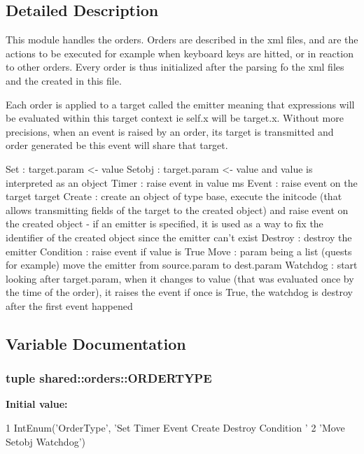 \subsection{\-Detailed \-Description}
\begin{DoxyVerb}
This module handles the orders.
Orders are described in the xml files, and are the actions to be executed
for example when keyboard keys are hitted, or in reaction to other orders.
Every order is thus initialized after the parsing fo the xml files
and the created in this file.

Each order is applied to a target called the emitter meaning that expressions
will be evaluated within this target context ie self.x will be target.x.
Without more precisions, when an event is raised by an order, its target is
transmitted and order generated be this event will share that target.

Set : target.param <- value
Setobj : target.param <- value and value is interpreted as an object
Timer : raise event in value ms
Event : raise event on the target target
Create : create an object of type base, execute the initcode (that allows
    transmitting fields of the target to the created object) and raise event on
    the created object - if an emitter is specified, it is used as a way to fix
    the identifier of the created object since the emitter can't exist
Destroy : destroy the emitter
Condition : raise event if value is True
Move : param being a list (quests for example) move the emitter from 
    source.param to dest.param
Watchdog : start looking after target.param, when it changes to value (that was
    evaluated once by the time of the order), it raises the event
    if once is True, the watchdog is destroy after the first event happened
\end{DoxyVerb}
 

\subsection{\-Variable \-Documentation}
\hypertarget{namespaceshared_1_1orders_afa012efe6f412d7cecc34589ae28e1eb}{
\subsubsection[{\-O\-R\-D\-E\-R\-T\-Y\-P\-E}]{\setlength{\rightskip}{0pt plus 5cm}tuple shared\-::orders\-::\-O\-R\-D\-E\-R\-T\-Y\-P\-E}}\label{namespaceshared_1_1orders_afa012efe6f412d7cecc34589ae28e1eb}
{\bfseries \-Initial value\-:}
\begin{DoxyCode}
1 IntEnum('OrderType', 'Set Timer Event Create Destroy Condition '
2                                  'Move Setobj Watchdog')
\end{DoxyCode}
